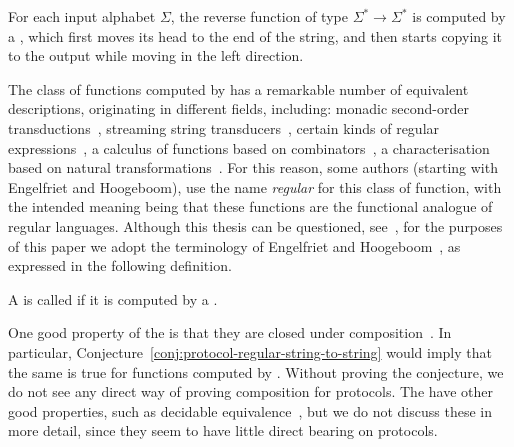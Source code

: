     \begin{myexample}[Reverse]
        For each input alphabet $\Sigma$, the reverse function of type
        $\Sigma^* \to \Sigma^*$ is computed by a , which
        first moves its head to the end of the string, and then starts copying
        it to the output while moving in the left direction.
    \end{myexample}

    The class of functions computed by  has a remarkable number
    of equivalent descriptions, originating in different fields, including:
    monadic second-order transductions~\cite[Section
    4]{engelfrietMSODefinableString2001}, streaming string
    transducers~\cite[Section 3]{alurExpressivenessStreamingString2010},
    certain kinds of regular expressions~\cite[Section 2]{alur2014regular}, a
    calculus of functions based on  combinators~\cite[Theorem
    6.1]{bojanczykRegularFirstOrderList2018}, a characterisation based on
    natural transformations~\cite[Theorem 3.2]{bojanczykTitoRegular23}. For
    this reason, some authors (starting with Engelfriet and Hoogeboom), use the
    name \emph{regular} for this class of function, with the intended meaning
    being that these functions are the functional analogue of regular
    languages. Although this thesis can be questioned,
    see~\cite{polyregular-survey}, for the purposes of this paper we adopt the
    terminology of Engelfriet and
    Hoogeboom~\cite[p.~217]{engelfrietMSODefinableString2001}, as expressed in
    the following definition.


    \begin{definition}
        \label{def:regular-string-to-string}
        A  is called 
        if it is computed by a .
    \end{definition}
    
    
    One good  property of the  is that
    they are closed under composition~\cite[Theorem
    2]{chytilSerialComposition2Way1977}. In particular,
    Conjecture~\ref{conj:protocol-regular-string-to-string} would imply that
    the same is true for functions computed by . Without proving
    the conjecture, we do not see any direct way of proving composition for
    protocols. The   have other good
    properties, such as decidable equivalence~\cite[Theorem
    1]{gurariEquivalenceProblemDeterministic1982}, but we do not discuss these
    in more detail, since they seem to have little direct bearing on protocols.


